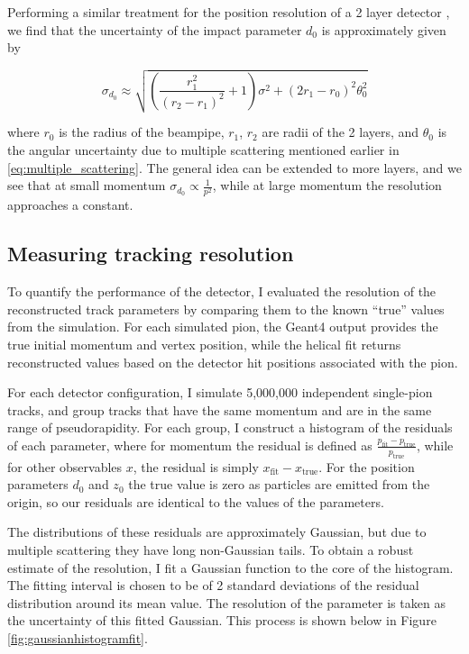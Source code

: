 \documentclass[titlepage]{article}[11pt]
\begin{document}
Performing a similar treatment for the position resolution of a 2 layer detector \cite{phdthesis}, we find that the uncertainty of the impact parameter $d_0$ is approximately given by

\begin{equation}
	\sigma_{d_0} \approx \sqrt{ \left( \frac{r_1^2}{(r_2 - r_1)^2} + 1 \right) \sigma^2 + (2r_1 - r_0)^2 \theta_0^2} \label{eq:d0_resolution}
\end{equation}

\noindent
where $r_0$ is the radius of the beampipe, $r_1$, $r_2$ are radii of the 2 layers, and $\theta_0$ is the angular uncertainty due to multiple scattering mentioned earlier in \ref{eq:multiple_scattering}. The general idea can be extended to more layers, and we see that at small momentum $\sigma_{d_0} \propto \frac{1}{p^2}$, while at large momentum the resolution approaches a constant. 

\subsection{Measuring tracking resolution} \label{Measuring tracking resolution}
To quantify the performance of the detector, I evaluated the resolution of the reconstructed track parameters by comparing them to the known “true” values from the simulation. For each simulated pion, the Geant4 output provides the true initial momentum and vertex position, while the helical fit returns reconstructed values based on the detector hit positions associated with the pion.

For each detector configuration, I simulate 5,000,000 independent single-pion tracks, and group tracks that have the same momentum and are in the same range of pseudorapidity. For each group, I construct a histogram of the residuals of each parameter, where for momentum the residual is defined as $\frac{p_{\mathrm{fit}} - p_{\mathrm{true}}}{p_{\mathrm{true}}}$, while for other observables $x$, the residual is simply $x_{\mathrm{fit}} - x_{\mathrm{true}}$. For the position parameters $d_0$ and $z_0$ the true value is zero as particles are emitted from the origin, so our residuals are identical to the values of the parameters.

The distributions of these residuals are approximately Gaussian, but due to multiple scattering they have long non-Gaussian tails. To obtain a robust estimate of the resolution, I fit a Gaussian function to the core of the histogram. The fitting interval is chosen to be of 2 standard deviations of the residual distribution around its mean value. The resolution of the parameter is taken as the uncertainty of this fitted Gaussian. This process is shown below in Figure \ref{fig:gaussianhistogramfit}.
\end{document}
